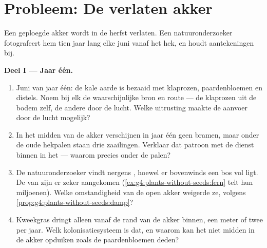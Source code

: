 \section{Probleem: De verlaten akker}

\begin{problem}\label{pb:g6:how-plants-spread:1}
Een geploegde akker wordt in de herfst verlaten. Een natuuronderzoeker
fotografeert hem tien jaar lang elke juni vanaf het hek, en houdt
aantekeningen bij.

\medskip\noindent\textbf{Deel I --- Jaar één.}
\begin{enumerate}
  \item Juni van jaar één: de kale aarde is bezaaid met klaprozen,
        paardenbloemen en distels. Noem bij elk de waarschijnlijke bron
        en route --- de klaprozen uit de bodem zelf, de andere door de
        lucht. Welke uitrusting maakte de aanvoer door de lucht mogelijk?
  \item In het midden van de akker verschijnen in jaar één geen bramen,
        maar onder de oude hekpalen staan drie zaailingen. Verklaar dat
        patroon met de dienst binnen in het  --- waarom precies
        onder de palen?
  \item De natuuronderzoeker vindt nergens , hoewel er bovenwinds
        een bos vol  ligt. De  van  zijn er zeker
        aangekomen (\cref{ex:g4:plants-without-seeds:fern} telt hun
        miljoenen). Welke omstandigheid van de open akker weigerde ze,
        volgens \cref{prop:g4:plants-without-seeds:damp}?
  \item Kweekgras dringt alleen vanaf de rand van de akker binnen, een
        meter of twee per jaar. Welk kolonisatiesysteem is dat, en
        waarom kan het niet midden in de akker opduiken zoals de
        paardenbloemen deden?
\end{enumerate}


\end{problem}
